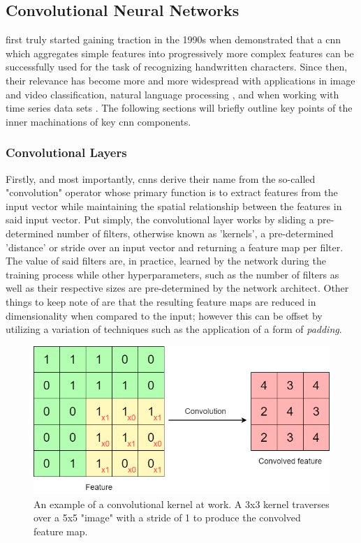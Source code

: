 \subsection{Convolutional Neural Networks}
\label{subsec:Background-Information:Forecasting-Models:Convolutional-Neural-Networks}
 first truly started gaining traction in the 1990s when \citet{LeCun} demonstrated that a \gls{cnn} which aggregates simple features into progressively more complex features can be successfully used for the task of recognizing handwritten characters. Since then, their relevance has become more and more widespread with applications in image and video classification, natural language processing \cite{Collobert}, and when working with time series data sets \cite{Tsantekidis}. The following sections will briefly outline key points of the inner machinations of key \gls{cnn} components.

\subsubsection{Convolutional Layers}
\label{subsubsec:Background-Information:Forecasting-Models:Convolutional-Neural-Networks:Convolutional-Layers}
Firstly, and most importantly, \glspl{cnn} derive their name from the so-called "convolution" operator whose primary function is to extract features from the input vector while maintaining the spatial relationship between the features in said input vector. Put simply, the convolutional layer works by sliding a pre-determined number of filters, otherwise known as 'kernels', a pre-determined 'distance' or stride over an input vector and returning a feature map per filter. The value of said filters are, in practice, learned by the network during the training process while other hyperparameters, such as the number of filters as well as their respective sizes are pre-determined by the network architect. Other things to keep note of are that the resulting feature maps are reduced in dimensionality when compared to the input; however this can be offset by utilizing a variation of techniques such as the application of a form of \textit{padding}.

\begin{figure}[hbt!]
    \centering
    \includegraphics[width=\textwidth]{Images/Chapter 3/CNN/Convolution-Illustration.png}
    \caption{An example of a convolutional kernel at work. A 3x3 kernel traverses over a 5x5 "image" with a stride of 1 to produce the convolved feature map.}
    \label{fig:Convolution-Illustration}
\end{figure}

